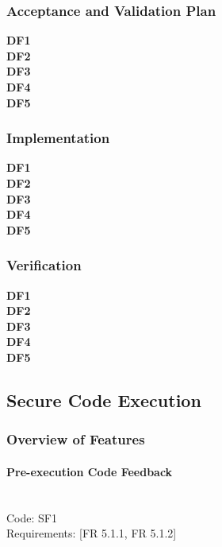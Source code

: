 \documentclass{article}
\begin{document}
\subsubsection{Acceptance and Validation Plan}
\textbf{DF1} \mbox{} \\
\textbf{DF2} \mbox{} \\
\textbf{DF3} \mbox{} \\
\textbf{DF4} \mbox{} \\
\textbf{DF5} \mbox{} \\

\subsubsection{Implementation}
\textbf{DF1} \mbox{} \\
\textbf{DF2} \mbox{} \\
\textbf{DF3} \mbox{} \\
\textbf{DF4} \mbox{} \\
\textbf{DF5} \mbox{} \\

\subsubsection{Verification}
\textbf{DF1} \mbox{} \\
\textbf{DF2} \mbox{} \\
\textbf{DF3} \mbox{} \\
\textbf{DF4} \mbox{} \\
\textbf{DF5} \mbox{} \\






\subsection{Secure Code Execution}
\subsubsection{Overview of Features}

\paragraph{Pre-execution Code Feedback} \mbox{} \\
\noindent Code: SF1 \\
\noindent Requirements: [FR 5.1.1, FR 5.1.2] 
\end{document}
